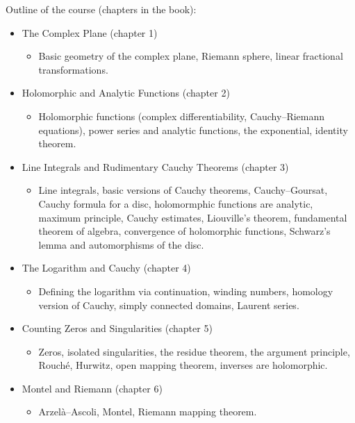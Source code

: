 \documentclass[10pt,aspectratio=169]{beamer}
\begin{document}
\begin{frame}
Outline of the course (chapters in the book):

\begin{itemize}
\item
The Complex Plane (chapter 1)
\begin{itemize}
\item Basic geometry of the complex plane,
Riemann sphere,
linear fractional transformations.
\end{itemize}

\pause
\item Holomorphic and Analytic Functions (chapter 2)
\begin{itemize}
\item
Holomorphic functions (complex differentiability, Cauchy--Riemann equations),
power series and analytic functions, the exponential, identity theorem.
\end{itemize}

\pause
\item Line Integrals and Rudimentary Cauchy Theorems (chapter 3)
\begin{itemize}
\item
Line integrals, basic versions of Cauchy theorems, Cauchy--Goursat,
Cauchy formula for a disc,
holomormphic functions are analytic,
maximum principle,
Cauchy estimates,
Liouville's theorem,
fundamental theorem of algebra,
convergence of holomorphic functions,
Schwarz's lemma and automorphisms of the disc.
\end{itemize}

\pause
\item The Logarithm and Cauchy (chapter 4)
\begin{itemize}
\item
Defining the logarithm via continuation,
winding numbers, homology version of Cauchy,
simply connected domains,
Laurent series.
\end{itemize}

\pause
\item Counting Zeros and Singularities (chapter 5)
\begin{itemize}
\item
Zeros, isolated singularities, the residue theorem,
the argument principle,
Rouch\'e, Hurwitz,
open mapping theorem, inverses are holomorphic.
\end{itemize}

\pause
\item Montel and Riemann (chapter 6)
\begin{itemize}
\item
Arzel\`a--Ascoli, Montel, Riemann mapping theorem.
\end{itemize}

\end{itemize}
\end{frame}
\end{document}
